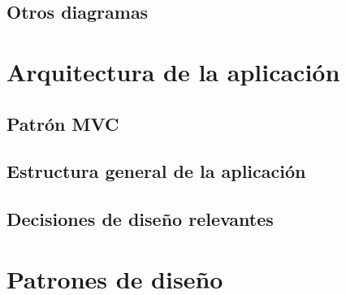 \documentclass[11pt]{article}
\begin{document}
\subsection{Otros diagramas}

\section{Arquitectura de la aplicación}

\subsection{Patrón MVC}

\subsection{Estructura general de la aplicación}

\subsection{Decisiones de diseño relevantes}



\section{Patrones de diseño}
\end{document}

